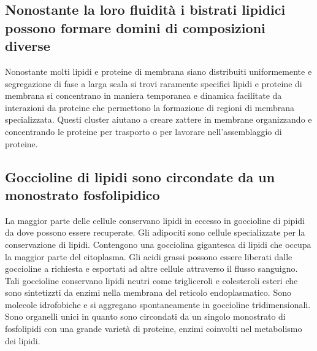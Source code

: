 \subsection{Nonostante la loro fluidit\`a i bistrati lipidici possono formare domini di composizioni diverse}
Nonostante molti lipidi e proteine di membrana siano distribuiti uniformemente e segregazione di fase a larga scala si trovi raramente specifici lipidi e proteine di membrana si 
concentrano in maniera temporanea e dinamica facilitate da interazioni da proteine che permettono la formazione di regioni di membrana specializzata. Questi cluster aiutano a creare
zattere in membrane organizzando e concentrando le proteine per trasporto o per lavorare nell'assemblaggio di proteine.
\subsection{Goccioline di lipidi sono circondate da un monostrato fosfolipidico}
La maggior parte delle cellule conservano lipidi in eccesso in goccioline di pipidi da dove possono essere recuperate. Gli adipociti sono cellule specializzate per la conservazione
di lipidi. Contengono una gocciolina gigantesca di lipidi che occupa la maggior parte del citoplasma. Gli acidi grassi possono essere liberati dalle goccioline a richiesta e esportati
ad altre cellule attraverso il flusso sanguigno. Tali goccioline conservano lipidi neutri come trigliceroli e colesteroli esteri che sono sintetizzti da enzimi nella membrana del
reticolo endoplasmatico. Sono molecole idrofobiche e si aggregano spontaneamente in goccioline tridimensionali. Sono organelli unici in quanto sono circondati da un singolo monostrato di
fosfolipidi con una grande variet\`a di proteine, enzimi coinvolti nel metabolismo dei lipidi. 
